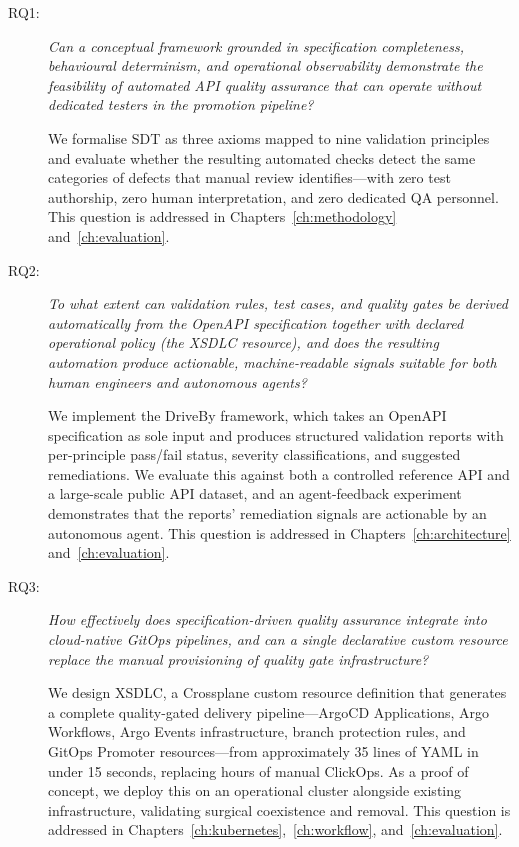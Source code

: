 \begin{description}
  \item[RQ1:] \textit{Can a conceptual framework grounded in specification completeness, behavioural determinism, and operational observability demonstrate the feasibility of automated API quality assurance that can operate without dedicated testers in the promotion pipeline?}

  We formalise SDT as three axioms mapped to nine validation principles and evaluate whether the resulting automated checks detect the same categories of defects that manual review identifies---with zero test authorship, zero human interpretation, and zero dedicated QA personnel. This question is addressed in Chapters~\ref{ch:methodology} and~\ref{ch:evaluation}.

  \item[RQ2:] \textit{To what extent can validation rules, test cases, and quality gates be derived automatically from the OpenAPI specification together with declared operational policy (the XSDLC resource), and does the resulting automation produce actionable, machine-readable signals suitable for both human engineers and autonomous agents?}

  We implement the DriveBy framework, which takes an OpenAPI specification as sole input and produces structured validation reports with per-principle pass/fail status, severity classifications, and suggested remediations. We evaluate this against both a controlled reference API and a large-scale public API dataset, and an agent-feedback experiment demonstrates that the reports' remediation signals are actionable by an autonomous agent. This question is addressed in Chapters~\ref{ch:architecture} and~\ref{ch:evaluation}.

  \item[RQ3:] \textit{How effectively does specification-driven quality assurance integrate into cloud-native GitOps pipelines, and can a single declarative custom resource replace the manual provisioning of quality gate infrastructure?}

  We design XSDLC, a Crossplane custom resource definition that generates a complete quality-gated delivery pipeline---ArgoCD Applications, Argo Workflows, Argo Events infrastructure, branch protection rules, and GitOps Promoter resources---from approximately 35 lines of YAML in under 15 seconds, replacing hours of manual ClickOps. As a proof of concept, we deploy this on an operational cluster alongside existing infrastructure, validating surgical coexistence and removal. This question is addressed in Chapters~\ref{ch:kubernetes},~\ref{ch:workflow}, and~\ref{ch:evaluation}.


\end{description}
